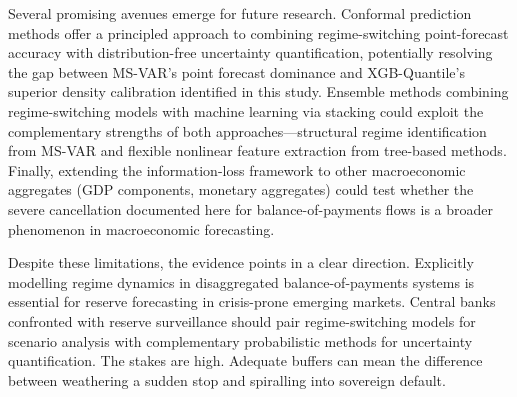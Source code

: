 \documentclass[12pt,a4paper]{article}
\begin{document}
Several promising avenues emerge for future research. Conformal prediction methods offer a principled approach to combining regime-switching point-forecast accuracy with distribution-free uncertainty quantification, potentially resolving the gap between MS-VAR's point forecast dominance and XGB-Quantile's superior density calibration identified in this study. Ensemble methods combining regime-switching models with machine learning via stacking could exploit the complementary strengths of both approaches---structural regime identification from MS-VAR and flexible nonlinear feature extraction from tree-based methods. Finally, extending the information-loss framework to other macroeconomic aggregates (GDP components, monetary aggregates) could test whether the severe cancellation documented here for balance-of-payments flows is a broader phenomenon in macroeconomic forecasting.

Despite these limitations, the evidence points in a clear direction. Explicitly modelling regime dynamics in disaggregated balance-of-payments systems is essential for reserve forecasting in crisis-prone emerging markets. Central banks confronted with reserve surveillance should pair regime-switching models for scenario analysis with complementary probabilistic methods for uncertainty quantification. The stakes are high. Adequate buffers can mean the difference between weathering a sudden stop and spiralling into sovereign default.
\end{document}

